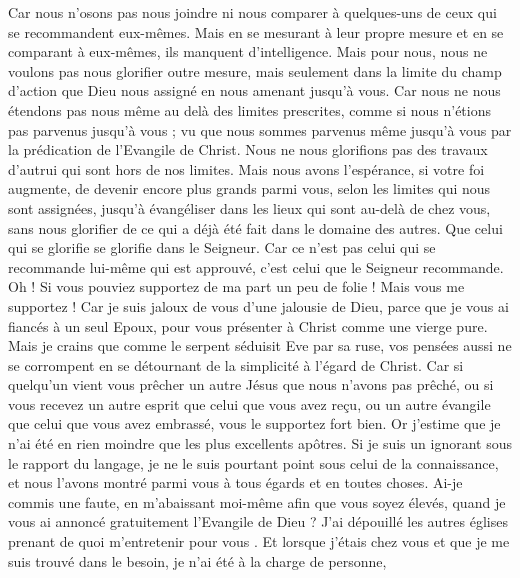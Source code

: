 \begin{multicols}{2}
Car nous n'osons pas nous joindre ni nous comparer à quelques-uns de ceux qui se recommandent eux-mêmes. Mais en se mesurant à leur propre mesure et en se comparant à eux-mêmes, ils manquent d’intelligence.
Mais pour nous, nous ne voulons pas nous glorifier outre mesure, mais seulement dans la limite du champ d’action que Dieu nous assigné en nous amenant jusqu’à vous.
Car nous ne nous étendons pas nous même au delà des limites prescrites, comme si nous n'étions pas parvenus jusqu'à vous ; vu que nous sommes parvenus même jusqu’à vous par la prédication de l'Evangile de Christ.
Nous ne nous glorifions pas des travaux d’autrui qui sont hors de nos limites. Mais nous avons l’espérance, si votre foi augmente, de devenir encore plus grands parmi vous, selon les limites qui nous sont assignées,
jusqu'à évangéliser dans les lieux qui sont au-delà de chez vous, sans nous glorifier de ce qui a déjà été fait dans le domaine des autres.
Que celui qui se glorifie se glorifie dans le Seigneur.
Car ce n'est pas celui qui se recommande lui-même qui est approuvé, c'est celui que le Seigneur recommande.
\VerseOne{}Oh ! Si vous pouviez supportez de ma part un peu de folie ! Mais vous me supportez !
Car je suis jaloux de vous d'une jalousie de Dieu, parce que je vous ai fiancés à un seul Epoux, pour vous présenter à Christ comme une vierge pure.
Mais je crains que comme le serpent séduisit Eve par sa ruse, vos pensées aussi ne se corrompent en se détournant de la simplicité à l’égard de Christ.
Car si quelqu'un vient vous prêcher un autre Jésus que nous n'avons pas prêché, ou si vous recevez un autre esprit que celui que vous avez reçu, ou un autre évangile que celui que vous avez embrassé, vous le supportez fort bien.
Or j'estime que je n'ai été en rien moindre que les plus excellents apôtres.
Si je suis un ignorant sous le rapport du langage, je ne le suis pourtant point sous celui de la connaissance, et nous l’avons montré parmi vous à tous égards et en toutes choses.
Ai-je commis une faute, en m’abaissant moi-même afin que vous soyez élevés, quand je vous ai annoncé gratuitement l’Evangile de Dieu ?
J'ai dépouillé les autres églises prenant de quoi m'entretenir pour vous . Et lorsque j’étais chez vous et que je me suis trouvé dans le besoin, je n’ai été à la charge de personne,

\end{multicols}
